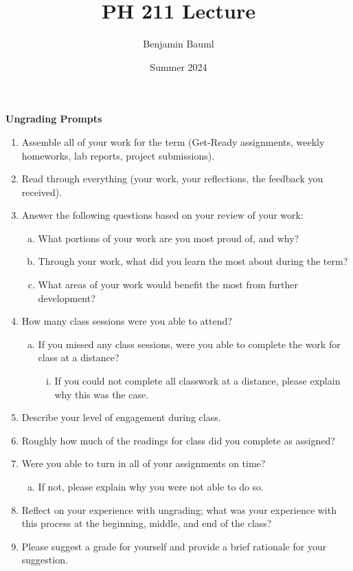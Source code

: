 \documentclass[]{article}
\title{PH 211 Lecture \Week}
\author{Benjamin Bauml}
\date{Summer 2024}
\begin{document}
\begin{TeacherMargin}
\noindent\textbf{Ungrading Prompts}
\begin{enumerate}[(1)]
	\item Assemble all of your work for the term (Get-Ready assignments, weekly homeworks, lab reports, project submissions).
	\item Read through everything (your work, your reflections, the feedback you received).
	\item Answer the following questions based on your review of your work:
	\begin{enumerate}[(a)]
		\item What portions of your work are you most proud of, and why?
		\item Through your work, what did you learn the most about during the term?
		\item What areas of your work would benefit the most from further development?
	\end{enumerate}
	\item How many class sessions were you able to attend?
	\begin{enumerate}[(a)]
		\item If you missed any class sessions, were you able to complete the work for class at a distance?
		\begin{enumerate}[(i)]
			\item If you could not complete all classwork at a distance, please explain why this was the case.
		\end{enumerate}
	\end{enumerate}
	\item Describe your level of engagement during class.
	\item Roughly how much of the readings for class did you complete as assigned?
	\item Were you able to turn in all of your assignments on time?
	\begin{enumerate}[(a)]
		\item If not, please explain why you were not able to do so.
	\end{enumerate}
	\item Reflect on your experience with ungrading; what was your experience with this process at the beginning, middle, and end of the class?
	\item Please suggest a grade for yourself and provide a brief rationale for your suggestion.
\end{enumerate}
\end{TeacherMargin}
\end{document}

